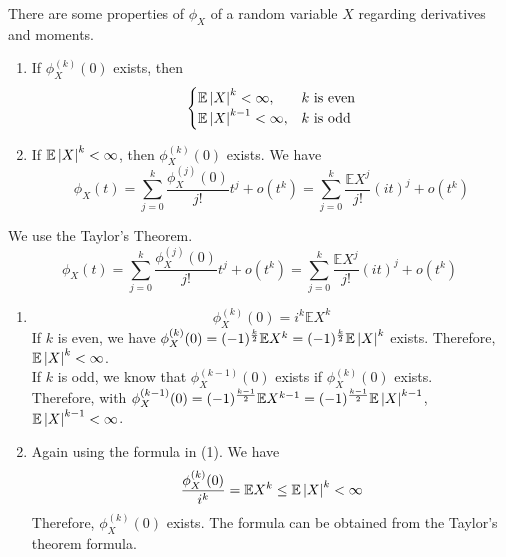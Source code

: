 \documentclass{huhtakm-template-book}
\newcommand{\expect}{\mathbb{E}}
\begin{document}
\begin{thm}
    There are some properties of $\phi_{X}$ of a random variable $X$ regarding derivatives and moments.
    \begin{enumerate}
        \item If $\phi_{X}^{(k)}(0)$ exists, then
        \begin{equation*}
            \begin{cases}
                \expect\abs{X}^{k}<\infty, &k\text{ is even}\\
                \expect\abs{X}^{k-1}<\infty, &k\text{ is odd}
            \end{cases}
        \end{equation*}
        \item If $\expect\abs{X}^{k}<\infty$, then $\phi_{X}^{(k)}(0)$ exists. We have
        \begin{equation*}
            \phi_{X}(t)=\sum_{j=0}^{k}\frac{\phi_{X}^{(j)}(0)}{j!}t^{j}+o(t^{k})=\sum_{j=0}^{k}\frac{\expect X^{j}}{j!}(it)^{j}+o(t^{k})
        \end{equation*}
    \end{enumerate}
\end{thm}
\begin{proofing}
    We use the Taylor's Theorem.
    \begin{equation*}
        \phi_{X}(t)=\sum_{j=0}^{k}\frac{\phi_{X}^{(j)}(0)}{j!}t^{j}+o(t^{k})=\sum_{j=0}^{k}\frac{\expect X^{j}}{j!}(it)^{j}+o(t^{k})
    \end{equation*}
    \begin{enumerate}
        \item 
        \begin{equation*}
            \phi_{X}^{(k)}(0)=i^{k}\expect X^{k}
        \end{equation*}
        If $k$ is even, we have $\phi_{X}^{(k)}(0)=(-1)^{\frac{k}{2}}\expect X^{k}=(-1)^{\frac{k}{2}}\expect\abs{X}^{k}$ exists. Therefore, $\expect\abs{X}^{k}<\infty$.\\
        If $k$ is odd, we know that $\phi_{X}^{(k-1)}(0)$ exists if $\phi_{X}^{(k)}(0)$ exists.\\
        Therefore, with $\phi_{X}^{(k-1)}(0)=(-1)^{\frac{k-1}{2}}\expect X^{k-1}=(-1)^{\frac{k-1}{2}}\expect\abs{X}^{k-1}$, $\expect\abs{X}^{k-1}<\infty$.
        \item Again using the formula in (1). We have
        \begin{equation*}
            \frac{\phi_{X}^{(k)}(0)}{i^{k}}=\expect X^{k}\leq\expect\abs{X}^{k}<\infty
        \end{equation*}
        Therefore, $\phi_{X}^{(k)}(0)$ exists. The formula can be obtained from the Taylor's theorem formula.
    \end{enumerate}
\end{proofing}
\end{document}
